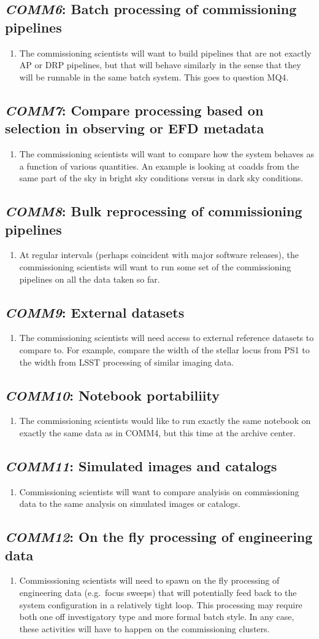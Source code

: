 \documentclass[DM,toc,lsstdraft]{lsstdoc}
\newcommand{\usecase}[3]{%
\subsection{\emph{#1}: #2}
\begin{enumerate}[label=\alph*.]
#3
\end{enumerate}
}
\begin{document}
\usecase{COMM6}{Batch processing of commissioning pipelines}{%

\item
The commissioning scientists will want to build pipelines that are not exactly AP or DRP pipelines, but that will behave similarly in the sense that they will be runnable in the same batch system.
This goes to question MQ4.

}

\usecase{COMM7}{Compare processing based on selection in observing or EFD metadata}{%

\item
The commissioning scientists will want to compare how the system behaves as a function of various quantities.
An example is looking at coadds from the same part of the sky in bright sky conditions versus in dark sky conditions.

}

\usecase{COMM8}{Bulk reprocessing of commissioning pipelines}{%

\item
At regular intervals (perhaps coincident with major software releases), the commissioning scientists will want to run some set of the commissioning pipelines on all the data taken so far.

}

\usecase{COMM9}{External datasets}{%

\item
The commissioning scientists will need access to external reference datasets to compare to.
For example, compare the width of the stellar locus from PS1 to the width from LSST processing of similar imaging data.

}

\usecase{COMM10}{Notebook portabiliity}{%

\item
The commissioning scientists would like to run exactly the same notebook on exactly the same data as in COMM4, but this time at the archive center.

}

\usecase{COMM11}{Simulated images and catalogs}{%

\item
Commissioning scientists will want to compare analyisis on commissioning data to the same analysis on simulated images or catalogs.

}

\usecase{COMM12}{On the fly processing of engineering data}{%

\item
Commisssioning scientists will need to spawn on the fly processing of engineering data (e.g.\ focus sweeps) that will potentially feed back to the system configuration in a relatively tight loop.
This processing may require both one off investigatory type and more formal batch style.
In any case, these activities will have to happen on the commissioning clusters.

}
\end{document}
